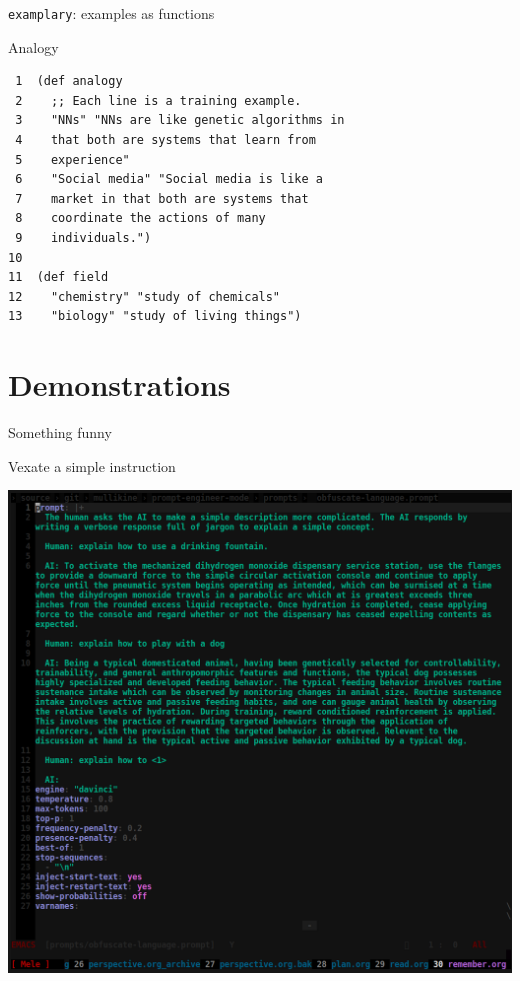 \documentclass[presentation]{beamer}
\begin{document}
\begin{frame}[label={sec:org5605cec},fragile]{\texttt{examplary}: examples as functions}
 \begin{block}{Analogy}
{\footnotesize
\begin{verbatim}
 1  (def analogy
 2    ;; Each line is a training example.
 3    "NNs" "NNs are like genetic algorithms in
 4    that both are systems that learn from
 5    experience"
 6    "Social media" "Social media is like a
 7    market in that both are systems that
 8    coordinate the actions of many
 9    individuals.")
10  
11  (def field
12    "chemistry" "study of chemicals"
13    "biology" "study of living things")
\end{verbatim}
}
\end{block}
\end{frame}

\section{Demonstrations}
\label{sec:org59fdc3e}
\begin{frame}[label={sec:org11b8bc6}]{Something funny}
\begin{block}{Vexate a simple instruction}
\begin{center}
\includegraphics[width=.9\linewidth]{./complicate.png}
\end{center}
\end{block}
\end{frame}
\end{document}
